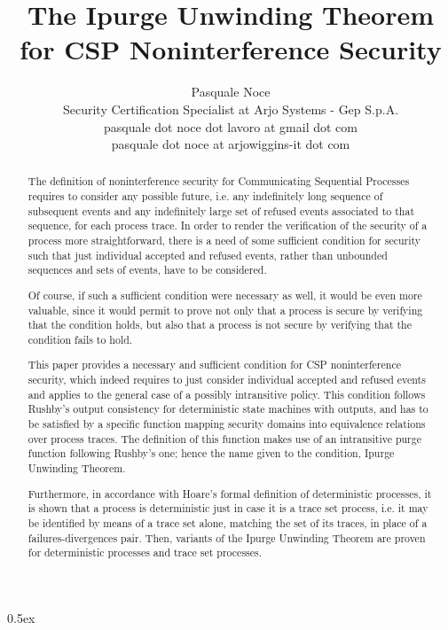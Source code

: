 \documentclass[11pt,a4paper]{article}
\begin{document}
\title{The Ipurge Unwinding Theorem\\for CSP Noninterference Security}
\author{Pasquale Noce\\Security Certification Specialist at Arjo Systems - Gep S.p.A.\\pasquale dot noce dot lavoro at gmail dot com\\pasquale dot noce at arjowiggins-it dot com}
\maketitle

\begin{abstract}
The definition of noninterference security for Communicating Sequential
Processes requires to consider any possible future, i.e. any indefinitely long
sequence of subsequent events and any indefinitely large set of refused events
associated to that sequence, for each process trace. In order to render the
verification of the security of a process more straightforward, there is a need
of some sufficient condition for security such that just individual accepted and
refused events, rather than unbounded sequences and sets of events, have to be
considered.

Of course, if such a sufficient condition were necessary as well, it would be
even more valuable, since it would permit to prove not only that a process is
secure by verifying that the condition holds, but also that a process is not
secure by verifying that the condition fails to hold.

This paper provides a necessary and sufficient condition for CSP noninterference
security, which indeed requires to just consider individual accepted and refused
events and applies to the general case of a possibly intransitive policy. This
condition follows Rushby's output consistency for deterministic state machines
with outputs, and has to be satisfied by a specific function mapping security
domains into equivalence relations over process traces. The definition of this
function makes use of an intransitive purge function following Rushby's one;
hence the name given to the condition, Ipurge Unwinding Theorem.

Furthermore, in accordance with Hoare's formal definition of deterministic
processes, it is shown that a process is deterministic just in case it is a
trace set process, i.e. it may be identified by means of a trace set alone,
matching the set of its traces, in place of a failures-divergences pair. Then,
variants of the Ipurge Unwinding Theorem are proven for deterministic processes
and trace set processes.
\end{abstract}

\tableofcontents

\parindent 0pt\parskip 0.5ex





\end{document}
